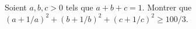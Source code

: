 Soient $a, b, c > 0$ tels que $a + b + c = 1$. Montrer que $(a + 1/a)^2 + (b + 1/b)^2 + (c + 1/c)^2 \geq 100/3$.
